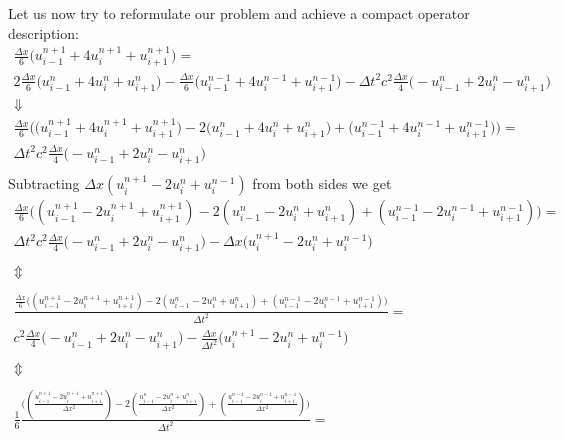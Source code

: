 \documentclass[a4paper,10pt]{article}
\begin{document}
\begin{description}
Let us now try to reformulate our problem and achieve a compact operator description:
\begin{multline*}
 \frac{\Delta x}{6} \Big( u_{i-1}^{n+1} + 4 u_{i}^{n+1} + u_{i+1}^{n+1} \Big) = \\
 2 \frac{\Delta x}{6} \Big( u_{i-1}^{n} + 4 u_{i}^{n} + u_{i+1}^{n} \Big) -
 \frac{\Delta x}{6} \Big( u_{i-1}^{n-1} + 4 u_{i}^{n-1} + u_{i+1}^{n-1} \Big) - 
 \Delta t^2 c^2 \frac{\Delta x}{4} \Big( - u_{i-1}^{n} + 2 u_{i}^{n} - u_{i+1}^{n} \Big)\\
 \Downarrow \\
 \frac{\Delta x}{6} \Big( \Big( u_{i-1}^{n+1} + 4 u_{i}^{n+1} + u_{i+1}^{n+1} \Big) -
 2 \Big( u_{i-1}^{n} + 4 u_{i}^{n} + u_{i+1}^{n} \Big) +
 \Big( u_{i-1}^{n-1} + 4 u_{i}^{n-1} + u_{i+1}^{n-1} \Big) \Big) = \\ 
 \Delta t^2 c^2 \frac{\Delta x}{4} \Big( - u_{i-1}^{n} + 2 u_{i}^{n} - u_{i+1}^{n} \Big)\\
\end{multline*}
Subtracting $\Delta x(u_i^{n+1} - 2 u_i^n + u_i^{n-1})$ from both sides we get 
\begin{multline*}
 \frac{\Delta x}{6} \Big( ( u_{i-1}^{n+1} - 2 u_{i}^{n+1} + u_{i+1}^{n+1} ) -
 2 ( u_{i-1}^{n} - 2 u_{i}^{n} + u_{i+1}^{n} ) +
( u_{i-1}^{n-1} - 2 u_{i}^{n-1} + u_{i+1}^{n-1} ) \Big) = \\ 
 \Delta t^2 c^2 \frac{\Delta x}{4} \Big( - u_{i-1}^{n} + 2 u_{i}^{n} - u_{i+1}^{n} \Big) - \Delta x \Big( u_i^{n+1} - 2 u_i^n + u_i^{n-1} \Big)\\
\\
 \Updownarrow \\
 \\
 \frac{ \frac{\Delta x}{6} \Big( ( u_{i-1}^{n+1} - 2 u_{i}^{n+1} + u_{i+1}^{n+1} ) -
 2 ( u_{i-1}^{n} - 2 u_{i}^{n} + u_{i+1}^{n} ) +
( u_{i-1}^{n-1} - 2 u_{i}^{n-1} + u_{i+1}^{n-1} ) \Big) }{\Delta t^2} = \\ 
 c^2 \frac{\Delta x}{4} \Big( - u_{i-1}^{n} + 2 u_{i}^{n} - u_{i+1}^{n} \Big) - \frac{\Delta x}{\Delta t^2} \Big( u_i^{n+1} - 2 u_i^n + u_i^{n-1} \Big)\\ 
\\
 \Updownarrow \\
\\
\frac{1}{6} \frac { \Big( ( \frac{u_{i-1}^{n+1} - 2 u_{i}^{n+1} + u_{i+1}^{n+1}}{\Delta x^2} ) -
 2 ( \frac{u_{i-1}^{n} - 2 u_{i}^{n} + u_{i+1}^{n}}{\Delta x^2} ) +
( \frac{ u_{i-1}^{n-1} - 2 u_{i}^{n-1} + u_{i+1}^{n-1}}{\Delta x^2} ) \Big) }{\Delta t^2} = \\ 

\end{multline*}
\end{description}
\end{document}
